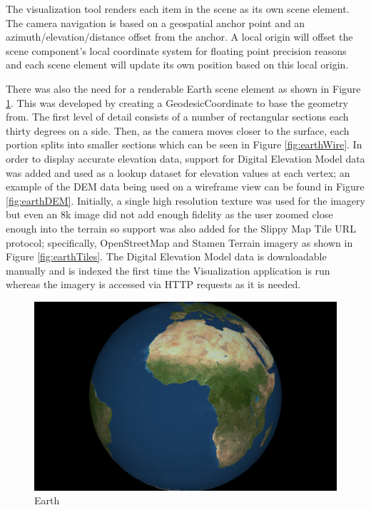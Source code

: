The visualization tool renders each item in the scene as its own scene element.
The camera navigation is based on a geospatial anchor point and an
azimuth/elevation/distance offset from the anchor. A local origin will offset
the scene component's local coordinate system for floating point precision
reasons and each scene element will update its own position based on this local
origin.

There was also the need for a renderable Earth scene element as shown in Figure
\ref{fig:earth}. This was developed by creating a GeodesicCoordinate to base the
geometry from. The first level of detail consists of a number of rectangular
sections each thirty degrees on a side. Then, as the camera moves closer to the
surface, each portion splits into smaller sections which can be seen in Figure
\ref{fig:earthWire}. In order to display accurate elevation data, support for
Digital Elevation Model data was added and used as a lookup dataset for
elevation values at each vertex; an example of the DEM data being used on a
wireframe view can be found in Figure \ref{fig:earthDEM}. Initially, a single
high resolution texture was used for the imagery but even an 8k image did not
add enough fidelity as the user zoomed close enough into the terrain so support
was also added for the Slippy Map Tile URL protocol; specifically, OpenStreetMap
and Stamen Terrain imagery as shown in Figure \ref{fig:earthTiles}. The Digital
Elevation Model data is downloadable manually and is indexed the first time the
Visualization application is run whereas the imagery is accessed via HTTP
requests as it is needed.

\begin{figure}[htp]
\begin{center}
  \includegraphics[width=.75\linewidth]{images/earth.png}
  \caption{Earth}
  \label{fig:earth}
\end{center}
\end{figure}

